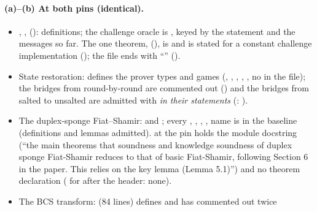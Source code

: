 \paragraph{(a)--(b) At both pins (identical).}
\begin{itemize}
\item {}, , 
  (): definitions; the challenge oracle is
  , keyed by the statement and the messages so far. The one
  theorem,  (), is  and is stated for a
  constant challenge implementation
  (); the file ends with
  ``''
  ().
\item State restoration:  defines the prover types and
  games (,
  , ,
  , , no
   in the file); the bridges from round-by-round are commented out
  () and the bridges from salted to unsalted are admitted with
   \emph{in their statements} (:
  ).
\item The duplex-sponge Fiat--Shamir:  and
  ;
  every , , ,
  ,  name is in the
  baseline (definitions and lemmas admitted).  at the pin holds the
  module docstring (``the main theorems that soundness and knowledge soundness of duplex sponge
  Fiat-Shamir reduces to that of basic Fiat-Shamir, following Section 6 in the paper. This relies
  on the key lemma (Lemma 5.1)'') and no theorem declaration ( for
   after the header: none).
\item The BCS transform:  (84 lines) defines
   and has  commented out twice

\end{itemize}
